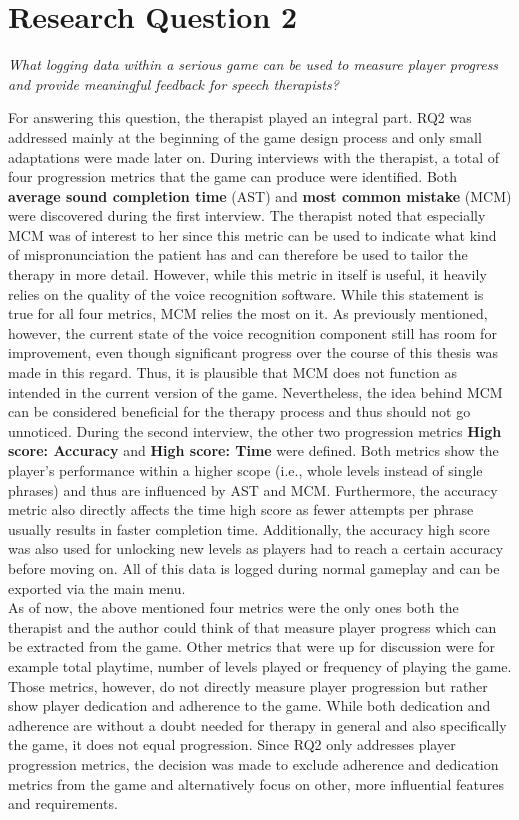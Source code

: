 \documentclass[draft,final]{vutinfth} %
\begin{document}
\section{Research Question 2}
\begin{center}
\emph{What logging data within a serious game can be used to measure player progress and provide meaningful feedback for speech therapists?}
\end{center} 

For answering this question, the therapist played an integral part. RQ2 was addressed mainly at the beginning of the game design process and only small adaptations were made later on. During interviews with the therapist, a total of four progression metrics that the game can produce were identified. Both \textbf{average sound completion time} (AST) and \textbf{most common mistake} (MCM) were discovered during the first interview. The therapist noted that especially MCM was of interest to her since this metric can be used to indicate what kind of mispronunciation the patient has and can therefore be used to tailor the therapy in more detail. However, while this metric in itself is useful, it heavily relies on the quality of the voice recognition software. While this statement is true for all four metrics, MCM relies the most on it. As previously mentioned, however, the current state of the voice recognition component still has room for improvement, even though significant progress over the course of this thesis was made in this regard. Thus, it is plausible that MCM does not function as intended in the current version of the game. Nevertheless, the idea behind MCM can be considered beneficial for the therapy process and thus should not go unnoticed. During the second interview, the other two progression metrics \textbf{High score: Accuracy} and \textbf{High score: Time} were defined. Both metrics show the player's performance within a higher scope (i.e., whole levels instead of single phrases) and thus are influenced by AST and MCM. Furthermore, the accuracy metric also directly affects the time high score as fewer attempts per phrase usually results in faster completion time. Additionally, the accuracy high score was also used for unlocking new levels as players had to reach a certain accuracy before moving on. All of this data is logged during normal gameplay and can be exported via the main menu. \\

As of now, the above mentioned four metrics were the only ones both the therapist and the author could think of that measure player progress which can be extracted from the game. Other metrics that were up for discussion were for example total playtime, number of levels played or frequency of playing the game. Those metrics, however, do not directly measure player progression but rather show player dedication and adherence to the game. While both dedication and adherence are without a doubt needed for therapy in general and also specifically the game, it does not equal progression. Since RQ2 only addresses player progression metrics, the decision was made to exclude adherence and dedication metrics from the game and alternatively focus on other, more influential features and requirements.
\end{document}
